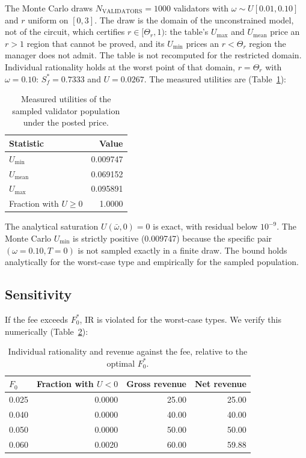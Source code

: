 \documentclass[11pt,a4paper]{article}
\numberwithin{equation}{section}
\numberwithin{table}{section}
\begin{document}
The Monte Carlo draws $N_{\mathrm{VALIDATORS}} = 1000$ validators with $\omega \sim U[0.01, 0.10]$ and $r$ uniform on $[0, 3]$. The draw is the domain of the unconstrained model, not of the circuit, which certifies $r \in [\Theta_r, 1)$: the table's $U_{\max}$ and $U_{\text{mean}}$ price an $r > 1$ region that cannot be proved, and its $U_{\min}$ prices an $r < \Theta_r$ region the manager does not admit. The table is not recomputed for the restricted domain. Individual rationality holds at the worst point of that domain, $r = \Theta_r$ with $\omega = 0.10$: $S_f^* = 0.7333$ and $U = 0.0267$. The measured utilities are (Table~\ref{tab:utilities}):

\begin{table}[H]
\centering
\caption{Measured utilities of the sampled validator population under the posted price.}
\label{tab:utilities}
\begin{tabular}{lr}
\toprule
Statistic & Value \\
\midrule
$U_{\min}$ & 0.009747 \\
$U_{\text{mean}}$ & 0.069152 \\
$U_{\max}$ & 0.095891 \\
Fraction with $U \geq 0$ & 1.0000 \\
\bottomrule
\end{tabular}
\end{table}

The analytical saturation $U(\bar{\omega}, 0) = 0$ is exact, with residual below $10^{-9}$. The Monte Carlo $U_{\min}$ is strictly positive (0.009747) because the specific pair $(\omega = 0.10, T = 0)$ is not sampled exactly in a finite draw. The bound holds analytically for the worst-case type and empirically for the sampled population.

\subsection{Sensitivity}
If the fee exceeds $F_0^*$, IR is violated for the worst-case types. We verify this numerically (Table~\ref{tab:fee-ir}):

\begin{table}[H]
\centering
\caption{Individual rationality and revenue against the fee, relative to the optimal $F_0^*$.}
\label{tab:fee-ir}
\begin{tabular}{lrrr}
\toprule
$F_0$ & Fraction with $U < 0$ & Gross revenue & Net revenue \\
\midrule
0.025 & 0.0000 & 25.00 & 25.00 \\
0.040 & 0.0000 & 40.00 & 40.00 \\
0.050 & 0.0000 & 50.00 & 50.00 \\
0.060 & 0.0020 & 60.00 & 59.88 \\
\bottomrule
\end{tabular}
\end{table}
\end{document}
